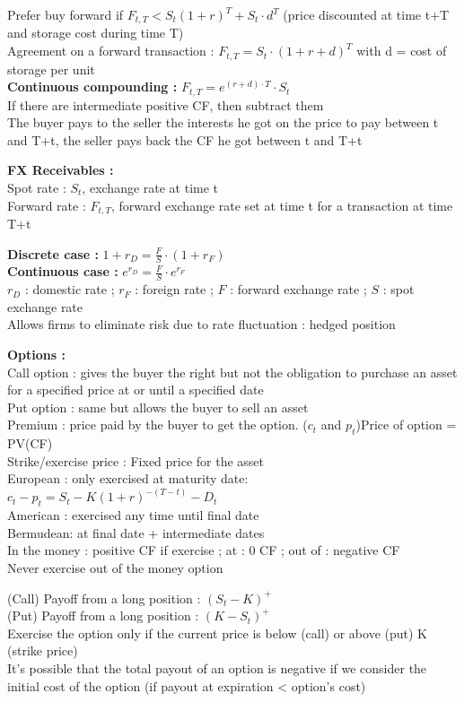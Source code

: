 \documentclass[a4paper,twocolumn]{article}
\begin{document}
Prefer buy forward if $F_{t,T} < S_t(1+r)^{T}+S_t\cdot d^T$ (price discounted at time t+T and storage cost during time T)\\
Agreement on a forward transaction : $F_{t,T} = S_t\cdot (1+r+d)^T$ with d = cost of storage per unit\\
\textbf{Continuous compounding :} $F_{t,T} = e^{(r+d)\cdot T}\cdot S_t$\\
If there are intermediate positive CF, then subtract them\\
The buyer pays to the seller the interests he got on the price to pay between t and T+t, the seller pays back the CF he got between t and T+t

\textbf{FX Receivables :}\\
Spot rate : $S_t$, exchange rate at time t\\
Forward rate : $F_{t,T}$, forward exchange rate set at time t for a transaction at time T+t

\textbf{Discrete case :} $1+r_D = \frac{F}{S}\cdot (1+r_F)$\\
\textbf{Continuous case :} $e^{r_D} = \frac{F}{S}\cdot e^{r_F}$\\
$r_D$ : domestic rate ; $r_F$ : foreign rate ; $F$ : forward exchange rate ; $S$ : spot exchange rate\\
Allows firms to eliminate risk due to rate fluctuation : hedged position

\textbf{Options :}\\
Call option : gives the buyer the right but not the obligation to purchase an asset for a specified price at or until a specified date\\
Put option : same but allows the buyer to sell an asset\\
Premium : price paid by the buyer to get the option. ($c_t$ and $p_t$)Price of option = PV(CF)\\
Strike/exercise price : Fixed price for the asset\\
European : only exercised at maturity date: $c_t - p_t = S_t - K(1+r)^{-(T-t)} -D_t$\\
American : exercised any time until final date\\
Bermudean: at final date + intermediate dates\\
In the money : positive CF if exercise ; at : 0 CF ; out of : negative CF\\
Never exercise out of the money option

(Call) Payoff from a long position : $(S_t-K)^+$\\
(Put) Payoff from a long position : $(K-S_t)^+$\\
Exercise the option only if the current price is below (call) or above (put) K (strike price)\\
It's possible that the total payout of an option is negative if we consider the initial cost of the option (if payout at expiration < option's cost)
\end{document}
